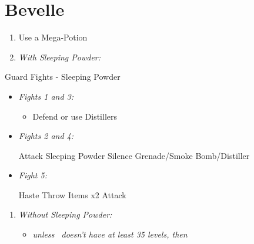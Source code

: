 \chapter{Bevelle}
\begin{enumerate}
  \item Use a Mega-Potion
  \item \textit{With Sleeping Powder:}
\end{enumerate}
\begin{battle}{Guard Fights - Sleeping Powder}
  \begin{itemize}
    \item \textit{Fights 1 and 3:}
          \begin{itemize}
            \tidusf Attack
            \item Defend or use Distillers
          \end{itemize}
    \item \textit{Fights 2 and 4:}
          \begin{itemize}
            \tidusf Attack
            \rikkuf Sleeping Powder
            \kimahrif Silence Grenade/Smoke Bomb/Distiller
          \end{itemize}
    \item \textit{Fight 5:}
          \begin{itemize}
            \tidusf Haste \rikku
            \rikkuf Throw Items x2
            \tidusf Attack
          \end{itemize}
  \end{itemize}
\end{battle}
\begin{enumerate}[resume]
  \item \textit{Without Sleeping Powder:}
        \begin{itemize}
          \item \formation{\tidus}{\rikku}{\auron} \textit{unless \lulu\ doesn't have at least 35 levels, then } \formation{\tidus}{\rikku}{\lulu}
        \end{itemize}
\end{enumerate}
\vfill

